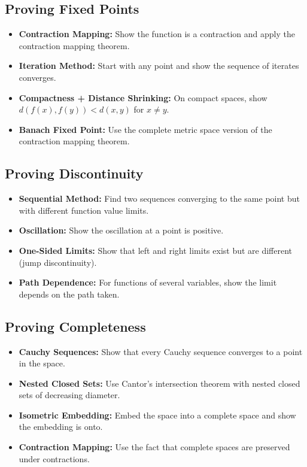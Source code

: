 \subsection*{Proving Fixed Points}

\begin{itemize}
\item \textbf{Contraction Mapping:} Show the function is a contraction and apply the contraction mapping theorem.

\item \textbf{Iteration Method:} Start with any point and show the sequence of iterates converges.

\item \textbf{Compactness + Distance Shrinking:} On compact spaces, show $d(f(x), f(y)) < d(x,y)$ for $x \neq y$.

\item \textbf{Banach Fixed Point:} Use the complete metric space version of the contraction mapping theorem.
\end{itemize}

\subsection*{Proving Discontinuity}

\begin{itemize}
\item \textbf{Sequential Method:} Find two sequences converging to the same point but with different function value limits.

\item \textbf{Oscillation:} Show the oscillation at a point is positive.

\item \textbf{One-Sided Limits:} Show that left and right limits exist but are different (jump discontinuity).

\item \textbf{Path Dependence:} For functions of several variables, show the limit depends on the path taken.
\end{itemize}

\subsection*{Proving Completeness}

\begin{itemize}
\item \textbf{Cauchy Sequences:} Show that every Cauchy sequence converges to a point in the space.

\item \textbf{Nested Closed Sets:} Use Cantor's intersection theorem with nested closed sets of decreasing diameter.

\item \textbf{Isometric Embedding:} Embed the space into a complete space and show the embedding is onto.

\item \textbf{Contraction Mapping:} Use the fact that complete spaces are preserved under contractions.
\end{itemize}

